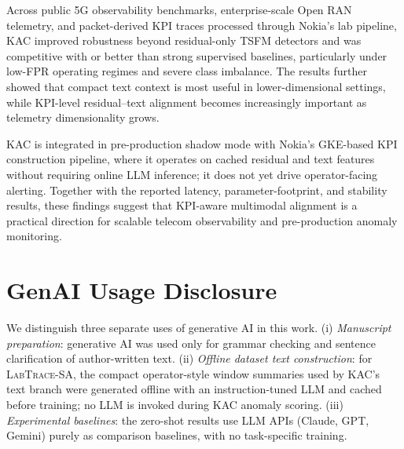 \documentclass[conference]{IEEEtran}
\begin{document}
Across public 5G observability benchmarks, enterprise-scale Open RAN telemetry, and packet-derived KPI traces processed through Nokia's lab pipeline, KAC improved robustness beyond residual-only TSFM detectors and was competitive with or better than strong supervised baselines, particularly under low-FPR operating regimes and severe class imbalance. The results further showed that compact text context is most useful in lower-dimensional settings, while KPI-level residual--text alignment becomes increasingly important as telemetry dimensionality grows.

KAC is integrated in pre-production shadow mode with Nokia's GKE-based KPI construction pipeline, where it operates on cached residual and text features without requiring online LLM inference; it does not yet drive operator-facing alerting. Together with the reported latency, parameter-footprint, and stability results, these findings suggest that KPI-aware multimodal alignment is a practical direction for scalable telecom observability and pre-production anomaly monitoring.

\section*{GenAI Usage Disclosure}
We distinguish three separate uses of generative AI in this work. (i) \emph{Manuscript preparation}: generative AI was used only for grammar checking and sentence clarification of author-written text. (ii) \emph{Offline dataset text construction}: for \textsc{LabTrace-SA}, the compact operator-style window summaries used by KAC's text branch were generated offline with an instruction-tuned LLM and cached before training; no LLM is invoked during KAC anomaly scoring. (iii) \emph{Experimental baselines}: the zero-shot results use LLM APIs (Claude, GPT, Gemini) purely as comparison baselines, with no task-specific training.



\end{document}

